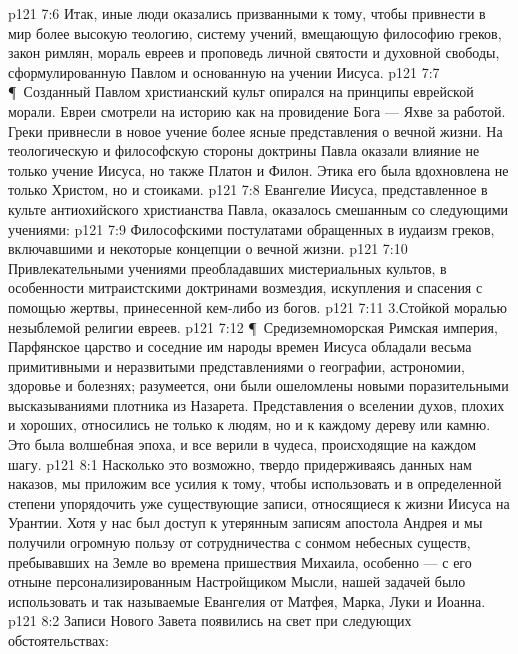 \vs p121 7:6 Итак, иные люди оказались призванными к тому, чтобы привнести в мир более высокую теологию, систему учений, вмещающую философию греков, закон римлян, мораль евреев и проповедь личной святости и духовной свободы, сформулированную Павлом и основанную на учении Иисуса.
\vs p121 7:7 \P\ Созданный Павлом христианский культ опирался на принципы еврейской морали. Евреи смотрели на историю как на провидение Бога --- Яхве за работой. Греки привнесли в новое учение более ясные представления о вечной жизни. На теологическую и философскую стороны доктрины Павла оказали влияние не только учение Иисуса, но также Платон и Филон. Этика его была вдохновлена не только Христом, но и стоиками.
\vs p121 7:8 Евангелие Иисуса, представленное в культе антиохийского христианства Павла, оказалось смешанным со следующими учениями:
\vs p121 7:9 \bibnobreakspace Философскими постулатами обращенных в иудаизм греков, включавшими и некоторые концепции о вечной жизни.
\vs p121 7:10 \bibnobreakspace Привлекательными учениями преобладавших мистериальных культов, в особенности митраистскими доктринами возмездия, искупления и спасения с помощью жертвы, принесенной кем\hyp{}либо из богов.
\vs p121 7:11 3.Стойкой моралью незыблемой религии евреев.
\vs p121 7:12 \P\ Средиземноморская Римская империя, Парфянское царство и соседние им народы времен Иисуса обладали весьма примитивными и неразвитыми представлениями о географии, астрономии, здоровье и болезнях; разумеется, они были ошеломлены новыми поразительными высказываниями плотника из Назарета. Представления о вселении духов, плохих и хороших, относились не только к людям, но и к каждому дереву или камню. Это была волшебная эпоха, и все верили в чудеса, происходящие на каждом шагу.
\vs p121 8:1 Насколько это возможно, твердо придерживаясь данных нам наказов, мы приложим все усилия к тому, чтобы использовать и в определенной степени упорядочить уже существующие записи, относящиеся к жизни Иисуса на Урантии. Хотя у нас был доступ к утерянным записям апостола Андрея и мы получили огромную пользу от сотрудничества с сонмом небесных существ, пребывавших на Земле во времена пришествия Михаила, особенно --- с его отныне персонализированным Настройщиком Мысли, нашей задачей было использовать и так называемые Евангелия от Матфея, Марка, Луки и Иоанна.
\vs p121 8:2 Записи Нового Завета появились на свет при следующих обстоятельствах:
